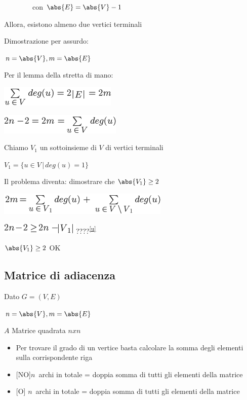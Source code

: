 \documentclass{article}
\providecommand{\tightlist}{%
  \setlength{\itemsep}{0pt}\setlength{\parskip}{0pt}}
\begin{document}
{~~~~~~~~con $\abs{E} = \abs{V} -1$}

{Allora, esistono almeno due vertici terminali}

{}

{Dimostrazione per assurdo:}

$n=\abs{V},m=\abs{E}$

{Per il lemma della stretta di mano:}

\includegraphics{images/image377.png}

\includegraphics{images/image378.png}

{Chiamo $V_1$ un sottoinsieme di $V$ di vertici terminali}

$V_1=\{u\in V\,|\,deg(u)=1\}$

{Il problema diventa: dimostrare che $\abs{V_1} \geq 2$}

\includegraphics{images/image382.png}

\includegraphics{images/image383.png}{????}\textsuperscript{\protect\hyperlink{cmnt21}{{[}u{]}}}

{$\abs{V_1} \geq 2$ OK}

\hypertarget{h.viqjw1dxzez8}{\subsection{\texorpdfstring{{Matrice di
adiacenza }}{Matrice di adiacenza }}\label{h.viqjw1dxzez8}}

{Dato }$G=(V,E)${~}

$n=\abs{V},m=\abs{E}$

{$A$ Matrice quadrata $n x n$ }

\begin{itemize}
\tightlist
\item
  {Per trovare il grado di un vertice basta calcolare la somma degli
  elementi sulla corrispondente riga}
\item
  {{[}NO{]}}$n${~archi in totale =
  doppia somma di tutti gli elementi della matrice}
\item
  {{[}O{]} }$n${~archi in totale =
  doppia somma di tutti gli elementi della matrice}
\end{itemize}
\end{document}
